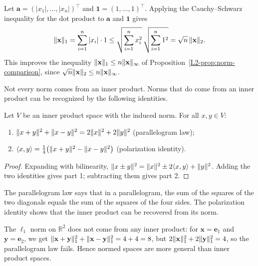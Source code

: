 \begin{example}\label{L2-ex:l1-l2}
    Let $\mathbf{a} = (|x_1|, \ldots, |x_n|)^\top$ and $\mathbf{1} = (1, \ldots, 1)^\top$. Applying the Cauchy--Schwarz inequality for the dot product to $\mathbf{a}$ and $\mathbf{1}$ gives
    \[\lVert \mathbf{x} \rVert_1 = \sum_{i=1}^n |x_i| \cdot 1 \leq \sqrt{\sum_{i=1}^n x_i^2} \, \sqrt{\sum_{i=1}^n 1^2} = \sqrt{n} \, \lVert \mathbf{x} \rVert_2.\]
    This improves the inequality $\lVert \mathbf{x} \rVert_1 \leq n \lVert \mathbf{x} \rVert_\infty$ of Proposition~\ref{L2-prop:norm-comparison}, since $\sqrt{n} \lVert \mathbf{x} \rVert_2 \leq n \lVert \mathbf{x} \rVert_\infty$.
\end{example}

Not every norm comes from an inner product. Norms that do come from an inner product can be recognized by the following identities.

\begin{proposition}\label{L2-prop:parallelogram}
    Let $V$ be an inner product space with the induced norm. For all $x, y \in V$:
    \begin{enumerate}
        \item $\lVert x + y \rVert^2 + \lVert x - y \rVert^2 = 2\lVert x \rVert^2 + 2\lVert y \rVert^2$ (parallelogram law);
        \item $\langle x, y \rangle = \frac{1}{4}\big(\lVert x + y \rVert^2 - \lVert x - y \rVert^2\big)$ (polarization identity).
    \end{enumerate}
\end{proposition}

\begin{proof}
    Expanding with bilinearity, $\lVert x \pm y \rVert^2 = \lVert x \rVert^2 \pm 2\langle x, y \rangle + \lVert y \rVert^2$. Adding the two identities gives part 1; subtracting them gives part 2.
\end{proof}

The parallelogram law says that in a parallelogram, the sum of the squares of the two diagonals equals the sum of the squares of the four sides. The polarization identity shows that the inner product can be recovered from its norm.

\begin{example}
    The $\ell_1$ norm on $\mathbb{R}^2$ does not come from any inner product: for $\mathbf{x} = \mathbf{e}_1$ and $\mathbf{y} = \mathbf{e}_2$, we get $\lVert \mathbf{x} + \mathbf{y} \rVert_1^2 + \lVert \mathbf{x} - \mathbf{y} \rVert_1^2 = 4 + 4 = 8$, but $2\lVert \mathbf{x} \rVert_1^2 + 2\lVert \mathbf{y} \rVert_1^2 = 4$, so the parallelogram law fails. Hence normed spaces are more general than inner product spaces.
\end{example}

